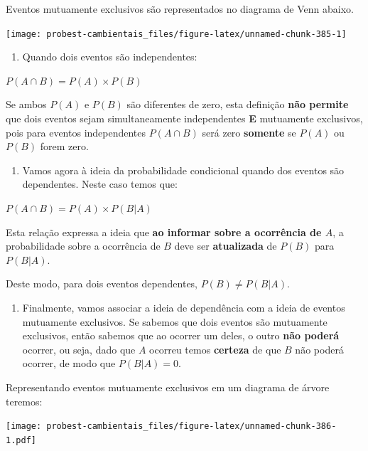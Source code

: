 \documentclass[
]{book}
\providecommand{\tightlist}{%
  \setlength{\itemsep}{0pt}\setlength{\parskip}{0pt}}
\begin{document}
Eventos mutuamente exclusivos são representados no diagrama de Venn abaixo.

\begin{center}\texttt{[image: probest-cambientais\_files/figure-latex/unnamed-chunk-385-1]} \end{center}

\begin{enumerate}
\def\labelenumi{\arabic{enumi}.}
\setcounter{enumi}{3}
\tightlist
\item
  Quando dois eventos são independentes:
\end{enumerate}

\(P(A \cap B) = P(A) \times P(B)\)

Se ambos \(P(A)\) e \(P(B)\) são diferentes de zero, esta definição \textbf{não permite} que dois eventos sejam simultaneamente independentes \textbf{E} mutuamente exclusivos, pois para eventos independentes \(P(A \cap B)\) será zero \textbf{somente} se \(P(A)\) ou \(P(B)\) forem zero.

\begin{enumerate}
\def\labelenumi{\arabic{enumi}.}
\setcounter{enumi}{4}
\tightlist
\item
  Vamos agora à ideia da probabilidade condicional quando dos eventos são dependentes. Neste caso temos que:
\end{enumerate}

\(P(A \cap B) = P(A) \times P(B|A)\)

Esta relação expressa a ideia que \textbf{ao informar sobre a ocorrência de \(A\)}, a probabilidade sobre a ocorrência de \(B\) deve ser \textbf{atualizada} de \(P(B)\) para \(P(B|A)\).

Deste modo, para dois eventos dependentes, \(P(B) \ne P(B|A)\).

\begin{enumerate}
\def\labelenumi{\arabic{enumi}.}
\setcounter{enumi}{5}
\tightlist
\item
  Finalmente, vamos associar a ideia de dependência com a ideia de eventos mutuamente exclusivos. Se sabemos que dois eventos são mutuamente exclusivos, então sabemos que ao ocorrer um deles, o outro \textbf{não poderá} ocorrer, ou seja, dado que \(A\) ocorreu temos \textbf{certeza} de que \(B\) não poderá ocorrer, de modo que \(P(B|A) = 0\).
\end{enumerate}

Representando eventos mutuamente exclusivos em um diagrama de árvore teremos:

\texttt{[image: probest-cambientais\_files/figure-latex/unnamed-chunk-386-1.pdf]}
\end{document}
